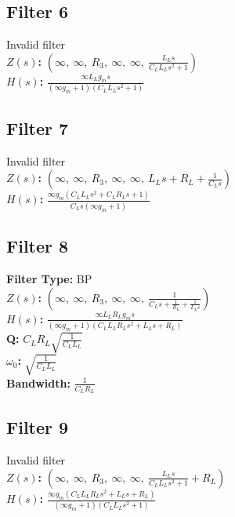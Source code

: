 \documentclass{article}
\begin{document}
\subsection*{Filter 6}
Invalid filter \\ 
\textbf{$Z(s)$:} $\left( \infty, \  \infty, \  R_{3}, \  \infty, \  \infty, \  \frac{L_{L} s}{C_{L} L_{L} s^{2} + 1}\right)$ \\ 
\textbf{$H(s)$:} $\frac{\infty L_{L} g_{m} s}{\left(\infty g_{m} + 1\right) \left(C_{L} L_{L} s^{2} + 1\right)}$ \\ 
\subsection*{Filter 7}
Invalid filter \\ 
\textbf{$Z(s)$:} $\left( \infty, \  \infty, \  R_{3}, \  \infty, \  \infty, \  L_{L} s + R_{L} + \frac{1}{C_{L} s}\right)$ \\ 
\textbf{$H(s)$:} $\frac{\infty g_{m} \left(C_{L} L_{L} s^{2} + C_{L} R_{L} s + 1\right)}{C_{L} s \left(\infty g_{m} + 1\right)}$ \\ 
\subsection*{Filter 8}
\textbf{Filter Type:} BP \\ 
\textbf{$Z(s)$:} $\left( \infty, \  \infty, \  R_{3}, \  \infty, \  \infty, \  \frac{1}{C_{L} s + \frac{1}{R_{L}} + \frac{1}{L_{L} s}}\right)$ \\ 
\textbf{$H(s)$:} $\frac{\infty L_{L} R_{L} g_{m} s}{\left(\infty g_{m} + 1\right) \left(C_{L} L_{L} R_{L} s^{2} + L_{L} s + R_{L}\right)}$ \\ 
\textbf{Q:} $C_{L} R_{L} \sqrt{\frac{1}{C_{L} L_{L}}}$ \\ 
\textbf{$\omega_0$:} $\sqrt{\frac{1}{C_{L} L_{L}}}$ \\ 
\textbf{Bandwidth:} $\frac{1}{C_{L} R_{L}}$ \\ 
\subsection*{Filter 9}
Invalid filter \\ 
\textbf{$Z(s)$:} $\left( \infty, \  \infty, \  R_{3}, \  \infty, \  \infty, \  \frac{L_{L} s}{C_{L} L_{L} s^{2} + 1} + R_{L}\right)$ \\ 
\textbf{$H(s)$:} $\frac{\infty g_{m} \left(C_{L} L_{L} R_{L} s^{2} + L_{L} s + R_{L}\right)}{\left(\infty g_{m} + 1\right) \left(C_{L} L_{L} s^{2} + 1\right)}$ \\ 
\end{document}

